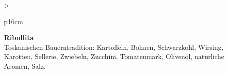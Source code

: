 \documentclass[
  beamerpaper,
  DIV=11,
  numbers=noendperiod,
  aspectratio=54]{scrreprt}
\begin{document}
\begin{table}

\caption{\label{tbl-panel-primi}Suppe}\begin{minipage}[t]{\linewidth}

\tabularnewline

\fontsize{16}{18}\selectfont
\begin{tabular}{>{\raggedright\arraybackslash}p{16cm}}
\toprule
\begingroup\fontsize{18}{20}\selectfont \textbf{Ribollita}\endgroup\\
\midrule
Toskanischen Bauerntradition: Kartoffeln, Bohnen, Schwarzkohl, Wirsing, Karotten, Sellerie, Zwiebeln, Zucchini, Tomatenmark, Olivenöl, natürliche Aromen, Salz.\\
\bottomrule
\end{tabular}

\end{minipage}%
\newline
\begin{minipage}[t]{\linewidth}


\end{minipage}%

\end{table}

\break
\end{document}
